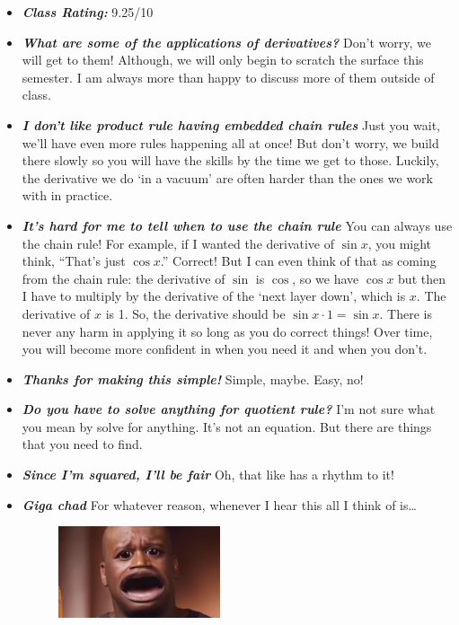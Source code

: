 \documentclass[11pt,letterpaper]{article}
\begin{document}
\begin{itemize}
\item {\bfseries\itshape Class Rating:} 9.25/10

\item {\bfseries\itshape What are some of the applications of derivatives?} Don't worry, we will get to them! Although, we will only begin to scratch the surface this semester. I am always more than happy to discuss more of them outside of class. 

\item {\bfseries\itshape I don't like product rule having embedded chain rules} Just you wait, we'll have even more rules happening all at once! But don't worry, we build there slowly so you will have the skills by the time we get to those. Luckily, the derivative we do `in a vacuum' are often harder than the ones we work with in practice.

\item {\bfseries\itshape It's hard for me to tell when to use the chain rule} You can always use the chain rule! For example, if I wanted the derivative of $\sin x$, you might think, ``That's just $\cos x$.'' Correct! But I can even think of that as coming from the chain rule: the derivative of $\sin$ is $\cos$, so we have $\cos x$ but then I have to multiply by the derivative of the `next layer down', which is $x$. The derivative of $x$ is 1. So, the derivative should be $\sin x \cdot 1= \sin x$. There is never any harm in applying it so long as you do correct things! Over time, you will become more confident in when you need it and when you don't. 

\item {\bfseries\itshape Thanks for making this simple!} Simple, maybe. Easy, no!

\item {\bfseries\itshape Do you have to solve anything for quotient rule?} I'm not sure what you mean by solve for anything. It's not an equation. But there are things that you need to find. 

\item {\bfseries\itshape Since I'm squared, I'll be fair} Oh, that like has a rhythm to it! 

\item {\bfseries\itshape Giga chad} For whatever reason, whenever I hear this all I think of is\dots
	\begin{figure}[H]
	\centering
	\includegraphics[width=0.45\textwidth]{images/skin.jpg}
	\end{figure}


\end{itemize}
\end{document}
